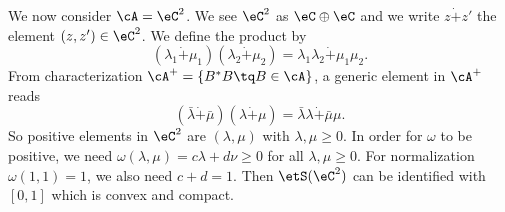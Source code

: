 We now consider $\cA=\eC^2$. We see $\eC^2$ as $\eC\oplus\eC$ and we write $z\dot + z'$ the element $(z,z')\in\eC^2$. We define the product by
\[ 
  (\lambda_1\dot +\mu_1)(\lambda_2\dot +\mu_2)=\lambda_1\lambda_2\dot +\mu_1\mu_2.
\]
From characterization $\cA^+=\{ B^*B\tq B\in\cA \}$, a generic element in $\cA^+$ reads
\[ 
  (\bar\lambda\dot +\bar\mu)(\lambda\dot +\mu)=\bar\lambda\lambda\dot +\bar\mu\mu.
\]
So positive elements in $\eC^2$ are $(\lambda,\mu)$ with $\lambda,\mu\geq 0$. In order for $\omega$ to be positive, we need $\omega(\lambda,\mu)=c\lambda+d\nu\geq 0$ for all $\lambda,\mu\geq0$. For normalization $\omega(1,1)=1$, we also need $c+d=1$. Then $\etS(\eC^2)$ can be identified with $[0,1]$ which is convex and compact.

